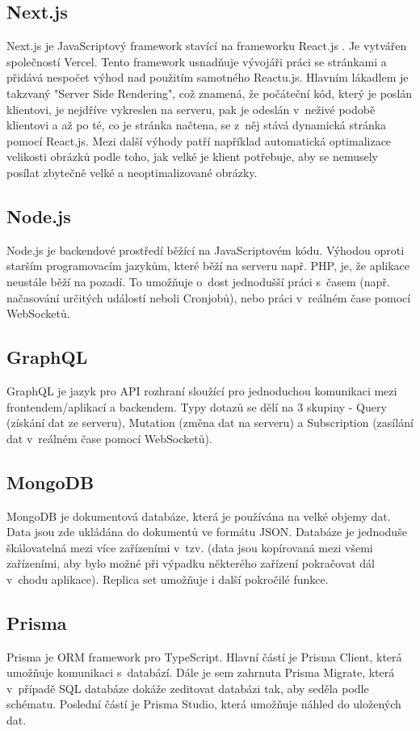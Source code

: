 \subsection{Next.js}
Next.js je JavaScriptový framework stavící na frameworku React.js \cite{Next}. Je vytvářen společností Vercel. Tento framework usnadňuje vývojáři práci se stránkami a přidává nespočet výhod nad použitím samotného Reactu.js. Hlavním lákadlem je takzvaný "Server Side Rendering", což znamená, že počáteční kód, který je poslán klientovi, je nejdříve vykreslen na serveru, pak je odeslán v~neživé podobě klientovi a až po té, co je stránka načtena, se z~něj stává dynamická stránka pomocí React.js. Mezi další výhody patří například automatická optimalizace velikosti obrázků podle toho, jak velké je klient potřebuje, aby se nemusely posílat zbytečně velké a neoptimalizované obrázky.

\subsection{Node.js}
Node.js je backendové prostředí běžící na JavaScriptovém kódu. Výhodou oproti starším programovacím jazykům, které běží na serveru např. PHP, je, že aplikace neustále běží na pozadí. To umožňuje o~dost jednodušší práci s~časem (např. načasování určitých událostí neboli Cronjobů), nebo práci v~reálném čase pomocí WebSocketů.

\subsection{GraphQL}
GraphQL je jazyk pro API rozhraní sloužící pro jednoduchou komunikaci mezi frontendem/aplikací a backendem. Typy dotazů se dělí na 3 skupiny - Query (získání dat ze serveru), Mutation (změna dat na serveru) a Subscription (zasílání dat v~reálném čase pomocí WebSocketů).

\subsection{MongoDB}
MongoDB je dokumentová databáze, která je používána na velké objemy dat. Data jsou zde ukládána do dokumentů ve formátu JSON. Databáze je jednoduše škálovatelná mezi více zařízeními v~tzv.  (data jsou kopírovaná mezi všemi zařízeními, aby bylo možné při výpadku některého zařízení pokračovat dál v~chodu aplikace). Replica set umožňuje i další pokročilé funkce.

\subsection{Prisma}
Prisma je ORM framework pro TypeScript. Hlavní částí je Prisma Client, která umožňuje komunikaci s~databází. Dále je sem zahrnuta Prisma Migrate, která v~případě SQL databáze dokáže zeditovat databázi tak, aby seděla podle schématu. Poslední částí je Prisma Studio, která umožňuje náhled do uložených dat.\cite{Prisma}

